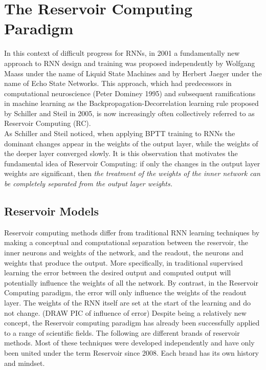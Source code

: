 \documentclass[12pt,oneside]{CUNY_CS_PhD}
\begin{document}
\chapter{The Reservoir Computing Paradigm}
In this context of difficult progress for RNNs, in 2001 a fundamentally new approach to RNN design and training was proposed independently by Wolfgang Maass under the name of Liquid State Machines and by Herbert Jaeger under the name of Echo State Networks. This approach, which had predecessors in computational neuroscience (Peter Dominey 1995) and subsequent ramifications in machine learning as the Backpropagation-Decorrelation learning rule proposed by Schiller and Steil in 2005, is now increasingly often collectively referred to as Reservoir Computing (RC).\\
As Schiller and Steil noticed, when applying BPTT training to RNNs the dominant changes appear in the weights of the output layer, while the weights of the deeper layer converged slowly. It is this observation that  motivates the fundamental idea of Reservoir Computing: if only the changes in the output layer weights are significant, then {\itshape the treatment of the weights of the inner network can be completely separated from the output layer weights.}

\section{Reservoir Models}
Reservoir computing methods differ from traditional RNN learning techniques by making a conceptual  and computational separation between the reservoir, the inner neurons and weights of the network, and the readout, the neurons and weights that produce the output. More specifically, in traditional supervised learning the error between the desired output and computed output will potentially influence the weights of all the network. By contrast, in the Reservoir Computing paradigm, the error will only influence the weights of the readout layer. The weights of the RNN itself are set at the start of the learning and do not change.
(DRAW PIC of influence of error)
Despite being a relatively new concept, the Reservoir computing paradigm has already been successfully applied to a range of scientific fields. The following are different brands of reservoir methods. Most of these techniques were developed independently and have only been united under the term Reservoir since 2008. Each brand has its own history and mindset.
\end{document}
